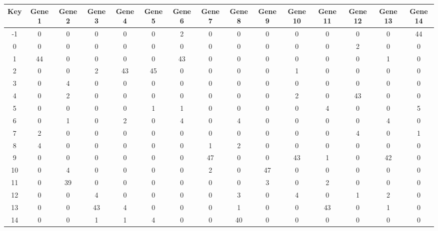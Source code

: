 \begin{tabular}{|c|c|c|c|c|c|c|c|c|c|c|c|c|c|c|}
\hline
Key & Gene 1 & Gene 2 & Gene 3 & Gene 4 & Gene 5 & Gene 6 & Gene 7 & Gene 8 & Gene 9 & Gene 10 & Gene 11 & Gene 12 & Gene 13 & Gene 14 \\
\hline
-1 & 0 & 0 & 0 & 0 & 0 & 2 & 0 & 0 & 0 & 0 & 0 & 0 & 0 & 44 \\
0 & 0 & 0 & 0 & 0 & 0 & 0 & 0 & 0 & 0 & 0 & 0 & 2 & 0 & 0 \\
1 & 44 & 0 & 0 & 0 & 0 & 43 & 0 & 0 & 0 & 0 & 0 & 0 & 1 & 0 \\
2 & 0 & 0 & 2 & 43 & 45 & 0 & 0 & 0 & 0 & 1 & 0 & 0 & 0 & 0 \\
3 & 0 & 4 & 0 & 0 & 0 & 0 & 0 & 0 & 0 & 0 & 0 & 0 & 0 & 0 \\
4 & 0 & 2 & 0 & 0 & 0 & 0 & 0 & 0 & 0 & 2 & 0 & 43 & 0 & 0 \\
5 & 0 & 0 & 0 & 0 & 1 & 1 & 0 & 0 & 0 & 0 & 4 & 0 & 0 & 5 \\
6 & 0 & 1 & 0 & 2 & 0 & 4 & 0 & 4 & 0 & 0 & 0 & 0 & 4 & 0 \\
7 & 2 & 0 & 0 & 0 & 0 & 0 & 0 & 0 & 0 & 0 & 0 & 4 & 0 & 1 \\
8 & 4 & 0 & 0 & 0 & 0 & 0 & 1 & 2 & 0 & 0 & 0 & 0 & 0 & 0 \\
9 & 0 & 0 & 0 & 0 & 0 & 0 & 47 & 0 & 0 & 43 & 1 & 0 & 42 & 0 \\
10 & 0 & 4 & 0 & 0 & 0 & 0 & 2 & 0 & 47 & 0 & 0 & 0 & 0 & 0 \\
11 & 0 & 39 & 0 & 0 & 0 & 0 & 0 & 0 & 3 & 0 & 2 & 0 & 0 & 0 \\
12 & 0 & 0 & 4 & 0 & 0 & 0 & 0 & 3 & 0 & 4 & 0 & 1 & 2 & 0 \\
13 & 0 & 0 & 43 & 4 & 0 & 0 & 0 & 1 & 0 & 0 & 43 & 0 & 1 & 0 \\
14 & 0 & 0 & 1 & 1 & 4 & 0 & 0 & 40 & 0 & 0 & 0 & 0 & 0 & 0 \\
\hline
\end{tabular}